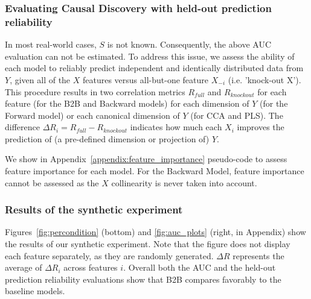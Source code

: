 \subsubsection{Evaluating Causal Discovery with held-out prediction reliability}

In most real-world cases, $S$ is not known. Consequently, the above AUC evaluation can not be estimated.
To address this issue, we assess the ability of each model to reliably predict
independent and identically distributed data from $Y$, given all of the $X$
features versus all-but-one feature $X_{-i}$ (i.e. 'knock-out X'). This
procedure results in two correlation metrics $R_{full}$ and $R_{knockout}$ for
each feature (for the B2B and Backward models) for each dimension of $Y$ (for
the Forward model) or each canonical dimension of $Y$ (for CCA and PLS). The
difference $\Delta R_i = R_{full}-R_{knockout}$ indicates how much each
$X_i$ improves the prediction of (a pre-defined dimension or projection of) $Y$.

We show in Appendix~\ref{appendix:feature_importance} pseudo-code to assess
feature importance for each model. For the Backward Model, feature importance
cannot be assessed as the $X$ collinearity is never
taken into account.

\subsubsection{Results of the synthetic experiment}

Figures~\ref{fig:percondition} (bottom) and \ref{fig:auc_plots} (right, in
Appendix) show the results of our synthetic experiment. Note that the figure
does not display each feature separately, as they are
randomly generated. $\Delta R$ represents the average of $\Delta R_i$ across
features $i$.
Overall both the AUC and the held-out prediction reliability evaluations
show that B2B compares favorably to the baseline models.
